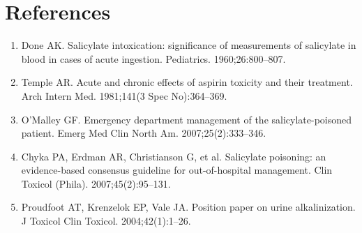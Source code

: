 \section*{References}
\begin{enumerate}
  \item Done AK. Salicylate intoxication: significance of measurements of salicylate in blood in cases of acute ingestion. Pediatrics. 1960;26:800--807.
  \item Temple AR. Acute and chronic effects of aspirin toxicity and their treatment. Arch Intern Med. 1981;141(3 Spec No):364--369.
  \item O'Malley GF. Emergency department management of the salicylate-poisoned patient. Emerg Med Clin North Am. 2007;25(2):333--346.
  \item Chyka PA, Erdman AR, Christianson G, et al. Salicylate poisoning: an evidence-based consensus guideline for out-of-hospital management. Clin Toxicol (Phila). 2007;45(2):95--131.
  \item Proudfoot AT, Krenzelok EP, Vale JA. Position paper on urine alkalinization. J Toxicol Clin Toxicol. 2004;42(1):1--26.
\end{enumerate}
\clearpage
